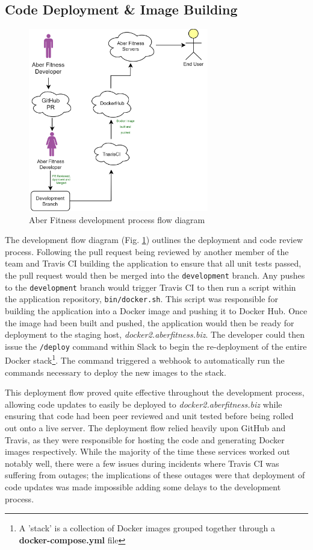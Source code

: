 
\subsection{Code Deployment \& Image Building}
\begin{figure}[H]
    \centering
    \includegraphics[width=0.7\textwidth]{Images/diagram_af.png}
    \caption{Aber Fitness development process flow diagram}
    \label{fig:development_flow_diagram}
\end{figure}

The development flow diagram (Fig. \ref{fig:development_flow_diagram}) outlines the deployment and code review process. Following the pull request being reviewed by another member of the team and Travis CI building the application to ensure that all unit tests passed, the pull request would then be merged into the \lstinline{development} branch. Any pushes to the \lstinline{development} branch would trigger Travis CI to then run a script within the application repository, \lstinline{bin/docker.sh}. This script was responsible for building the application into a Docker image and pushing it to Docker Hub. Once the image had been built and pushed, the application would then be ready for deployment to the staging host, \textit{docker2.aberfitness.biz}. The developer could then issue the \lstinline{/deploy} command within Slack to begin the re-deployment of the entire Docker stack\footnote{A 'stack' is a collection of Docker images grouped together through a \textbf{docker-compose.yml} file}. The command triggered a webhook to automatically run the commands necessary to deploy the new images to the stack. 

This deployment flow proved quite effective throughout the development process, allowing code updates to easily be deployed to \textit{docker2.aberfitness.biz} while ensuring that code had been peer reviewed and unit tested before being rolled out onto a live server. The deployment flow relied heavily upon GitHub and Travis, as they were responsible for hosting the code and generating Docker images respectively. While the majority of the time these services worked out notably well, there were a few issues during incidents where Travis CI was suffering from outages; the implications of these outages were that deployment of code updates was made impossible \textemdash adding some delays to the development process.


